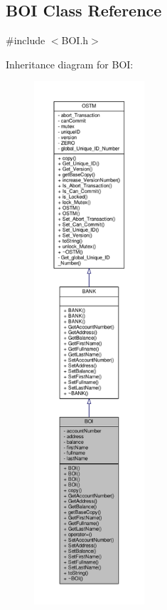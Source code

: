 \hypertarget{class_b_o_i}{}\subsection{B\+OI Class Reference}
\label{class_b_o_i}


{\ttfamily \#include $<$B\+O\+I.\+h$>$}



Inheritance diagram for B\+OI\+:\nopagebreak
\begin{figure}[H]
\begin{center}
\leavevmode
\includegraphics[height=550pt]{class_b_o_i__inherit__graph}
\end{center}
\end{figure}


